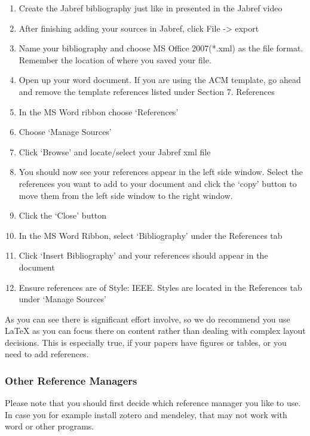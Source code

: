 \begin{enumerate}
\def\labelenumi{\arabic{enumi}.}
\tightlist
\item
  Create the Jabref bibliography just like in presented in the Jabref
  video
\item
  After finishing adding your sources in Jabref, click
  File -\textgreater{} export
\item
  Name your bibliography and choose MS Office 2007(*.xml) as the file
  format. Remember the location of where you saved your file.
\item
  Open up your word document. If you are using the ACM template, go
  ahead and remove the template references listed under
  Section 7. References
\item
  In the MS Word ribbon choose `References'
\item
  Choose `Manage Sources'
\item
  Click `Browse' and locate/select your Jabref xml file
\item
  You should now see your references appear in the left side window.
  Select the references you want to add to your document and click the
  `copy' button to move them from the left side window to the right
  window.
\item
  Click the `Close' button
\item
  In the MS Word Ribbon, select `Bibliography' under the References tab
\item
  Click `Insert Bibliography' and your references should appear in the
  document
\item
  Ensure references are of Style: IEEE. Styles are located in the
  References tab under `Manage Sources'
\end{enumerate}

As you can see there is significant effort involve, so we do recommend
you use LaTeX as you can focus there on content rather than dealing with
complex layout decisions. This is especially true, if your papers have
figures or tables, or you need to add references.

\subsubsection{Other Reference Managers}\label{other-reference-managers}

Please note that you should first decide which reference manager you
like to use. In case you for example install zotero and mendeley, that
may not work with word or other programs.

